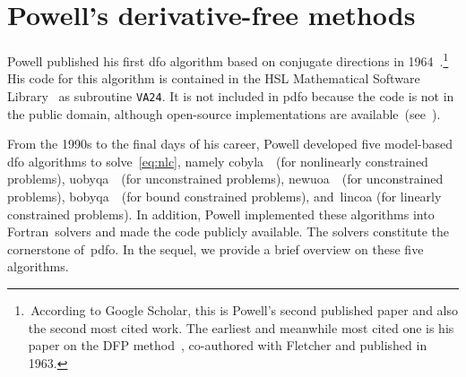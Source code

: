 \documentclass[11pt,draft]{article}
\numberwithin{equation}{section}
\def\fortran{\mbox{Fortran}}
\begin{document}
\section{Powell's derivative-free methods}
\label{sec:powell}

Powell published his first \gls{dfo} algorithm based on conjugate directions in
1964~\cite{Powell_1964}.\footnote{\,According to Google Scholar, this is Powell's second published
paper and also the second most cited work. The earliest and meanwhile most cited one is his paper on
the DFP method~\cite{Fletcher_Powell_1963}, co-authored with Fletcher and published in 1963.} His
code for this algorithm is contained in the HSL Mathematical Software Library~\cite{HSL} as
subroutine \texttt{VA24}. It is not included in \gls{pdfo} because the code is not in the public
domain, although open-source implementations are available~(see~\cite[footnote~4]{Conn_Scheinberg_Toint_1997b}).

From the 1990s to the final days of his career, Powell developed five model-based \gls{dfo} algorithms to
solve~\eqref{eq:nlc}, namely
\gls{cobyla}~\cite{Powell_1994}~(for nonlinearly constrained problems),
\gls{uobyqa}~\cite{Powell_2002}~(for unconstrained problems),
\gls{newuoa}~\cite{Powell_2006}~(for unconstrained problems),
\gls{bobyqa}~\cite{Powell_2009}~(for bound constrained problems),
and~\gls{lincoa} (for linearly constrained problems).
In addition, Powell implemented these algorithms into \fortran~solvers and made
the code publicly available. The solvers constitute the cornerstone of~\gls{pdfo}.
In the sequel, we provide a brief overview on these five algorithms.
\end{document}
